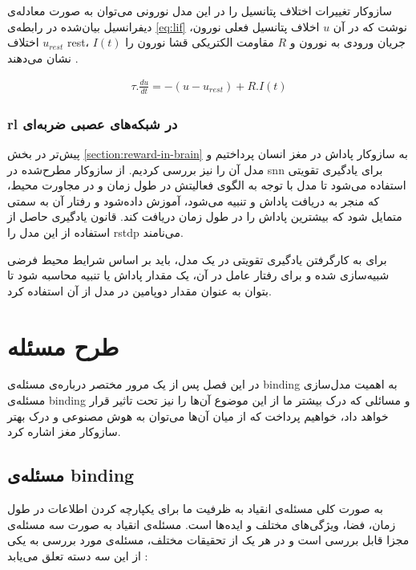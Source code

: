 \documentclass[12pt]{report}
\begin{document}
	ساز‌وکار تغییرات اختلاف پتانسیل را در این مدل نورونی می‌توان به صورت معادله‌ی دیفرانسیل بیان‌شده در رابطه‌ی \ref{eq:lif} نوشت که در آن $u$ اخلاف پتانسیل فعلی نورون، $u_{rest}$ اختلاف \gls{rest}، $I(t)$ جریان ورودی به نورون و $R$ مقاومت الکتریکی قشا نورون را نشان می‌دهند
	\cite{gerstner2014neuronal}.
	
	\begin{align}
		\tau . \frac{du}{dt} = -(u - u_{rest}) + R . I(t) 
		\label{eq:lif}
	\end{align}

	\subsection{\gls{rl} در شبکه‌های عصبی ضربه‌ای}
	
	پیش‌تر در بخش \ref{section:reward-in-brain} به سازوکار پاداش در مغز انسان پرداختیم و مدل آن را نیز بررسی کردیم. از سازوکار مطرح‌شده در \gls{snn} برای یادگیری تقویتی استفاده می‌شود تا مدل با توجه به الگوی فعالیتش در طول زمان و در مجاورت محیط، که منجر به دریافت پاداش و تنبیه می‌شود، آموزش داده‌شود و رفتار آن به سمتی متمایل شود که بیشترین پاداش را در طول زمان دریافت کند. قانون یادگیری حاصل از استفاده از این مدل را \gls{rstdp} می‌نامند.
	
	برای به کار‌گرفتن یادگیری تقویتی در یک مدل، باید بر اساس شرایط محیط فرضی شبیه‌سازی شده و برای رفتار عامل در آن، یک مقدار پاداش یا تنبیه محاسبه شود تا بتوان به عنوان مقدار دوپامین در مدل از آن استفاده کرد.
 	
	
	\chapter{طرح مسئله}
	
	در این فصل پس از یک مرور مختصر درباره‌ی مسئله‌ی \gls{binding} به اهمیت مدل‌سازی مسئله‌ی \gls{binding} و مسائلی که درک بیشتر ما از این موضوع آن‌ها را نیز تحت تاثیر قرار خواهد داد، خواهیم پرداخت که از میان آن‌ها می‌توان به هوش مصنوعی و درک بهتر ساز‌وکار مغز اشاره کرد.
	
	\section{مسئله‌ی \gls{binding}}
	
	به صورت کلی مسئله‌ی انقیاد به ظرفیت ما برای یکپارچه کردن اطلاعات در طول زمان، فضا، ویژگی‌های مختلف و ایده‌ها است. مسئله‌ی انقیاد به صورت سه مسئله‌ی مجزا قابل بررسی است و در هر یک از تحقیقات مختلف، مسئله‌ی مورد بررسی به یکی از این سه دسته تعلق می‌یابد \cite{Treisman1999}:
	
\end{document}
